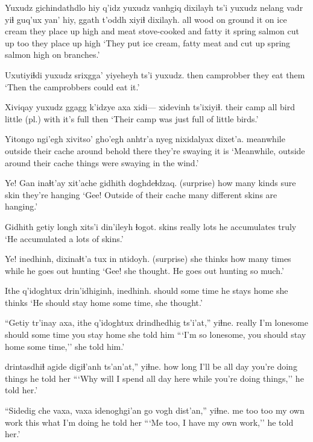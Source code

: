 \documentclass[12pt]{article}
\begin{document}
\gll Yuxudz gichindathdlo hiy q'idz yuxudz vanhgiq   dixilayh ts'i yuxudz nelang vadr         yiɬ {guq'ux yan'} hiy, ggath         t'oddh xiyiɬ dixilayh.
all    {wood on ground} it on {}  {ice cream} {they place up high} and {} meat   stove-cooked and fatty       it {spring salmon} {cut up} too  {they place up high}
\glt `They put ice cream, fatty meat and cut up spring salmon high on branches.'
\glend

\gll Uxutiyiɬdi yuxudz srixgga'   yiyeheyh ts'i yuxudz.
then       {}     camprobber {they eat them} {}  
\glt `Then the camprobbers could eat it.'
\glend

\gll Xiviqay       yuxudz ggagg k'idzye axa xidi--- xidevinh ts'ixiyiɬ.
{their camp} all  bird {little (pl.)}   with {} {it's full} then
\glt `Their camp was just full of little birds.'
\glend

\gll Yitongo   ngi'egh xivitso' gho'egh   anhtr'a nyeg nixidalyax      dixet'a.
meanwhile outside {their cache} around behold there {they're swaying} {it is}
\glt `Meanwhile, outside around their cache things were swaying in the wind.'
\glend

\gll Ye! {Gan inaɬt'ay}   xit'ache gidhith doghdeɬdzaq.
(surprise) {how many kinds} sure  skin    {they're hanging}
\glt `Gee! Outside of their cache many different skins are hanging.'
\glend

\gll Gidhith getiy  longh {xits'i din'ileyh} ɬogot.
skins   really lots         {he accumulates}  truly
\glt `He accumulated a lots of skins.'
\glend

\gll Ye! inedhinh, dixinaɬt'a tux   {in ntidoyh.}
(surprise) {she thinks} {how many times} while {he goes out hunting}
\glt `Gee! she thought. He goes out hunting so much.'
\glend

\gll Ithe   q'idoghtux drin'idhiginh,  inedhinh.
should {some time} {he stays home} {she thinks}
\glt `He should stay home some time, she thought.'
\glend

\gll ``Getiy  {tr'inay  axa,} ithe   q'idoghtux drindhedhig     ts'i'at,'' yiɬne.
really {I'm lonesome} should {some time} {you stay home}  {} {she told him}
\glt ```I'm so lonesome, you should stay home some time,'' she told him.'
\glend

 drintasdhiɬ     agide digiɬ'anh ts'an'at,'' yiɬne.
{how long}           {I'll be all day} {}   {you're doing things} {} {he told her}
\glt ```Why will I spend all day here while you're doing things,'' he told her.'
\glend

\gll ``Sidedig che vaxa, {vaxa idenoghgi'an}          go   {vogh dist'an,''}   yiɬne.
{me too}  too   {}       {my own work}  this {what I'm doing} {he told her}
\glt ```Me too, I have my own work,'' he told her.'
\glend
\end{document}

